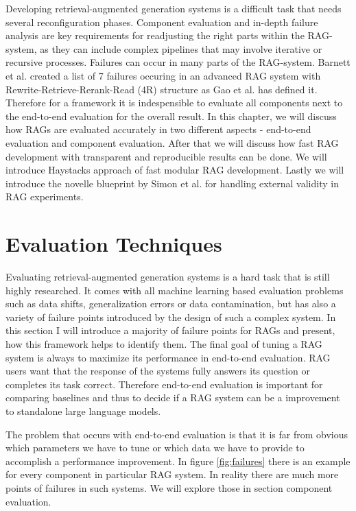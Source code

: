 

Developing retrieval-augmented generation systems is a difficult task that needs several reconfiguration phases.\cite{Simon.10112024} Component evaluation and in-depth failure analysis are key requirements for readjusting the right parts within the RAG-system, as they can include complex pipelines that may involve iterative or recursive processes. Failures can occur in many parts of the RAG-system. Barnett et al.\cite{Barnett.2024} created a list of 7 failures occuring in an advanced RAG system with Rewrite-Retrieve-Rerank-Read (4R) structure as Gao et al.\cite{Gao.18.12.2023} has defined it. Therefore for a framework it is indespensible to evaluate all components next to the end-to-end evaluation for the overall result. In this chapter, we will discuss how RAGs are evaluated accurately in two different aspects - end-to-end evaluation and component evaluation. After that we will discuss how fast RAG development with transparent and reproducible results can be done. We will introduce Haystacks approach of fast modular RAG development. Lastly we will introduce the novelle blueprint by Simon et al.\cite{Simon.10112024} for handling external validity in RAG experiments. 

\section{Evaluation Techniques}

Evaluating retrieval-augmented generation systems is a hard task that is still highly researched. It comes with all machine learning based evaluation problems such as data shifts, generalization errors or data contamination, but has also a variety of failure points introduced by the design of such a complex system. In this section I will introduce a majority of failure points for RAGs and present, how this framework helps to identify them. The final goal of tuning a RAG system is always to maximize its performance in end-to-end evaluation. RAG users want that the response of the systems fully answers its question or completes its task correct. Therefore end-to-end evaluation is important for comparing baselines and thus to decide if a RAG system can be a improvement to standalone large language models. 


The problem that occurs with end-to-end evaluation is that it is far from obvious which parameters we have to tune or which data we have to provide to accomplish a performance improvement. In figure \ref{fig:failures} there is an example for every component in particular RAG system. In reality there are much more points of failures in such systems. We will explore those in section component evaluation.

